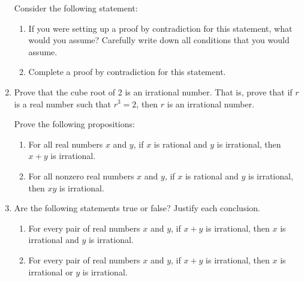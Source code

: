 \begin{enumerate}
\xitem Consider the following statement:
\label{exer:sec33-2}%

%
\begin{enumerate}
  \item If you were setting up a proof by contradiction for this statement, what would you assume?  Carefully write down all conditions that you would assume.

  \item Complete a proof by contradiction for this statement.  
\end{enumerate}

\item Prove that the cube root of 2 is an irrational number.  That is, prove that if $r$ is a real number such that $r^3 = 2$, then $r$ is an irrational number.


\xitem Prove the following propositions:
\label{exer:sec33-3}%
\begin{enumerate}
\item For all real numbers  $x$  and  $y$, if  $x$  is rational and  $y$  is irrational, then  
$x + y$  is irrational.

\item For all nonzero real numbers  $x$  and  $y$, if  $x$  is rational and  $y$  is irrational, then  
$xy$  is irrational.
\end{enumerate}

\item	Are the following statements true or false?  Justify each conclusion. 
\label{exer:sec33-4}%

\begin{enumerate}
  \yitem For each positive real number  $x$,  if  $x$  is irrational, then  $x^2 $  is irrational.
  \yitem For each positive real number  $x$,  if  $x$  is irrational, then  $\sqrt x $  is irrational.
  \item For every pair of real numbers $x$ and $y$, if $x + y$ is irrational, then $x$ is         irrational and $y$ is irrational.
  \item For every pair of real numbers $x$ and $y$, if $x + y$ is irrational, then $x$ is         irrational or $y$ is irrational.
\end{enumerate}



\end{enumerate}
